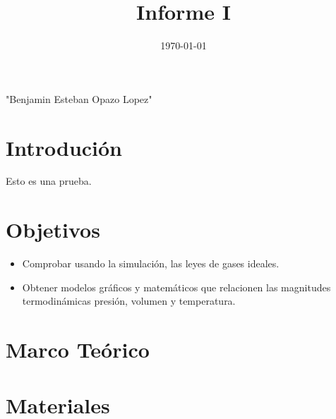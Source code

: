 \documentclass[]{article}
\title{Informe I}
\author{}
\date{\today}
\begin{document}
\maketitle  

"Benjamin Esteban Opazo Lopez"

\tableofcontents
\section{Introdución}
Esto es una prueba.



\section{Objetivos}
\begin{itemize}
    \item Comprobar usando la simulación, las leyes de gases ideales.
    \item Obtener modelos gráficos y matemáticos que relacionen las magnitudes termodinámicas presión,
    volumen y temperatura.
\end{itemize}


\section{Marco Teórico}




\section{Materiales}


\end{document}

